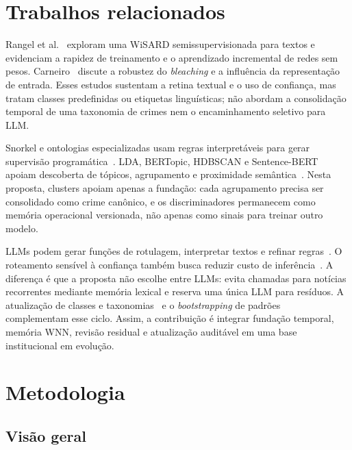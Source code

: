 \section{Trabalhos relacionados}

Rangel et al.~\cite{rangel2016ssw} exploram uma WiSARD semissupervisionada para textos e evidenciam a rapidez de treinamento e o aprendizado incremental de redes sem pesos. Carneiro~\cite{carneiro2017weightless} discute a robustez do \textit{bleaching} e a influência da representação de entrada. Esses estudos sustentam a retina textual e o uso de confiança, mas tratam classes predefinidas ou etiquetas linguísticas; não abordam a consolidação temporal de uma taxonomia de crimes nem o encaminhamento seletivo para LLM.

Snorkel e ontologias especializadas usam regras interpretáveis para gerar supervisão programática~\cite{ratner2017snorkel,ratner2018drybell,ratner2020snorkel,fries2021ontology}. LDA, BERTopic, HDBSCAN e Sentence-BERT apoiam descoberta de tópicos, agrupamento e proximidade semântica~\cite{blei2003lda,grootendorst2022bertopic,mcinnes2017hdbscan,reimers2019sbert}. Nesta proposta, clusters apoiam apenas a fundação: cada agrupamento precisa ser consolidado como crime canônico, e os discriminadores permanecem como memória operacional versionada, não apenas como sinais para treinar outro modelo.

LLMs podem gerar funções de rotulagem, interpretar textos e refinar regras~\cite{smith2022lml,guan2023labelfunctions,huang2024clustering,sosnovikov2025lgiwl}. O roteamento sensível à confiança também busca reduzir custo de inferência~\cite{shah2025select}. A diferença é que a proposta não escolhe entre LLMs: evita chamadas para notícias recorrentes mediante memória lexical e reserva uma única LLM para resíduos. A atualização de classes e taxonomias~\cite{xia2021incremental,tuan2016temporal,balakrishnan2025taxonomy} e o \textit{bootstrapping} de padrões~\cite{agichtein2000snowball} complementam esse ciclo. Assim, a contribuição é integrar fundação temporal, memória WNN, revisão residual e atualização auditável em uma base institucional em evolução.

\section{Metodologia}

\subsection{Visão geral}


